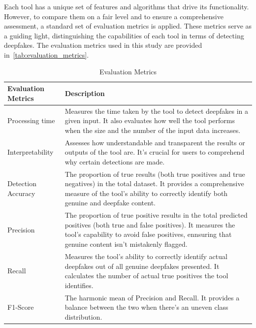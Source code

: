 Each tool has a unique set of features and algorithms that drive its functionality.
However, to compare them on a fair level and to ensure a comprehensive
assessment, a standard set of evaluation metrics is applied. These metrics serve
as a guiding light, distinguishing the capabilities of each tool in terms of
detecting deepfakes. The evaluation metrics used in this study are provided in~\autoref{tab:evaluation_metrics}.

\begin{table}[htpb]
	\caption{Evaluation Metrics}\label{tab:evaluation_metrics}
	\centering
	\small
	\begin{tabularx}{\textwidth}{l X}
		\toprule
		\textbf{Evaluation Metrics} & \textbf{Description}                                     \\
		\midrule
		Processing time             & Measures the time taken by the tool to detect
		deepfakes in a given input. It also evaluates how well the tool performs
		when the size and the number of the input data increases.                              \\
		\addlinespace
		Interpretability            & Assesses how understandable and transparent
		the results or outputs of the tool are. It's crucial for users to comprehend
		why certain detections are made.                                                       \\
		\addlinespace
		Detection Accuracy          & The proportion of true results (both true
		positives and true negatives) in the total dataset. It provides a comprehensive
		measure of the tool's ability to correctly identify both genuine and deepfake content. \\
		\addlinespace
		Precision                   & The proportion of true positive results in the
		total predicted positives (both true and false positives). It measures the tool's capability to avoid false positives,
		ennsuring that genuine content isn't mistakenly flagged.                               \\
		\addlinespace
		Recall                      & Measures the tool's ability to correctly
		identify actual deepfakes out of all genuine deepfakes presented. It calculates the
		number of actual true positives the tool identifies.                                   \\
		\addlinespace
		F1-Score                    & The harmonic mean of Precision and Recall.
		It provides a balance between the two when there's an uneven class distribution.       \\
		\bottomrule
	\end{tabularx}
\end{table}

